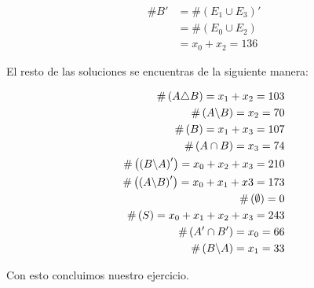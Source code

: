 \begin{align*}
	\# B' 
	&= \#\left(E_1 \cup E_3\right)'\\
	&= \#\left(E_0 \cup E_2\right)\\
	&= x_0 + x_2 = 136
\end{align*}

El resto de las soluciones se encuentras de la siguiente manera:

\begin{align*}
	\#\left( A\triangle B \right) = x_1+x_2 = 103  \\
	\#\left( A\backslash B \right) = x_2 = 70 \\
	\#\left( B \right) = x_1+x_3=107	\\
	\#\left( A \cap B \right) = x_3 = 74 \\
	\#\left( \left(B\backslash A\right)' \right) 
	= x_0+x_2+x_3 = 210 \\
	\#\left( \left(A\backslash B\right)' \right)
	= x_0+x_1+x3 = 173 \\
	\#\left( \emptyset \right) = 0 \\
	\#\left( S \right) = x_0+x_1+x_2+x_3 = 243 \\
	\#\left( A' \cap B' \right) = x_0 = 66\\
	\#\left( B\backslash A \right) = x_1 = 33
\end{align*}

Con esto concluimos nuestro ejercicio. 